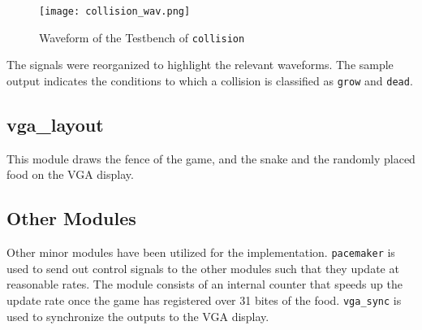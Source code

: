 \documentclass[paper=usletter, fontsize=12pt]{article}
\begin{document}
        \begin{figure}[ht]
            \begin{center}
                \texttt{[image: collision\_wav.png]}
                \caption{Waveform of the Testbench of \texttt{collision}}
                \label{fig:collision_wav}
            \end{center}
        \end{figure}

        The signals were reorganized to highlight the relevant waveforms. The
        sample output indicates the conditions to which a collision is
        classified as \texttt{grow} and \texttt{dead}.

        \subsection{vga\_layout} This module draws the fence of the game, and
        the snake and the randomly placed food on the VGA display.

        \subsection{Other Modules} Other minor modules have been utilized for
        the implementation. \texttt{pacemaker} is used to send out control
        signals to the other modules such that they update at reasonable rates.
        The module consists of an internal counter that speeds up the update
        rate once the game has registered over 31 bites of the food.
        \texttt{vga\_sync} is used to synchronize the outputs to the VGA
        display.
\end{document}
